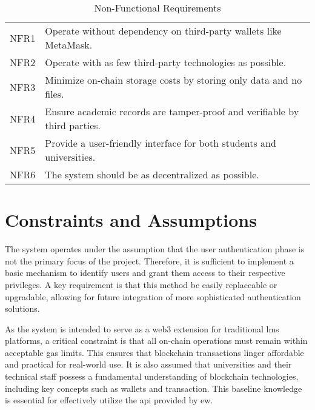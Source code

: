 \begin{table}
\centering
\caption{Non-Functional Requirements}
\label{tab:nonFuncReq}
\begin{tabular}{|p{1.0cm}|p{11cm}|}
\hline
NFR1 & Operate without dependency on third-party wallets like MetaMask. \\
NFR2 & Operate with as few third-party technologies as possible. \\
NFR3 & Minimize on-chain storage costs by storing only data and no files. \\
NFR4 & Ensure academic records are tamper-proof and verifiable by third parties. \\
NFR5 & Provide a user-friendly interface for both students and universities. \\
NFR6 & The system should be as decentralized as possible. \\
\hline
\end{tabular}
\end{table}


\section{Constraints and Assumptions}
The system operates under the assumption that the user authentication phase is not the primary focus of the project. Therefore, it is sufficient to implement a basic mechanism to identify users and grant them access to their respective privileges. A key requirement is that this method be easily replaceable or upgradable, allowing for future integration of more sophisticated authentication solutions.

As the system is intended to serve as a \Gls{web3} extension for traditional \acrshort{lms} platforms, a critical constraint is that all on-chain operations must remain within acceptable gas limits. This ensures that blockchain transactions linger affordable and practical for real-world use. It is also assumed that universities and their technical staff possess a fundamental understanding of blockchain technologies, including key concepts such as wallets and transaction. This baseline knowledge is essential for effectively utilize the \acrshort{api} provided by \acrshort{ew}.
